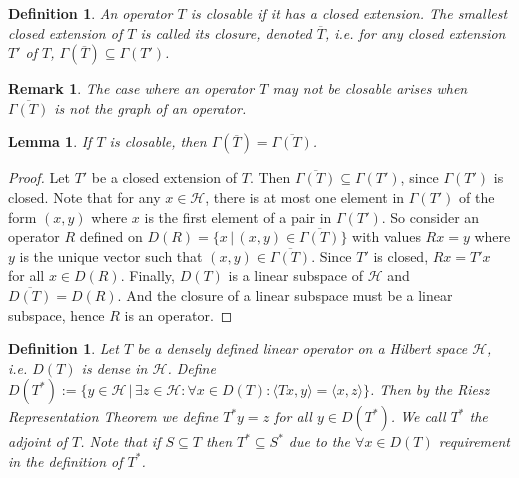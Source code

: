 \documentclass[12pt,oneside]{report}
\newtheorem{lem}[thm]{Lemma}
\newtheorem{defn}[thm]{Definition}
\newtheorem{rem}[thm]{Remark}
\begin{document}
\begin{defn}
    An operator $T$ is closable if it has a closed extension. The smallest closed extension of $T$ is called its closure, denoted $\overline{T}$, i.e. for any closed extension $T'$ of $T$, $\Gamma(\overline{T}) \subseteq \Gamma(T')$.
\end{defn}

\begin{rem}
    The case where an operator $T$ may not be closable arises when $\overline{\Gamma(T)}$ is not the graph of an operator.
\end{rem}

\begin{lem}
    If $T$ is closable, then $\Gamma(\overline{T}) = \overline{\Gamma(T)}$.
\end{lem}
\begin{proof}
    Let $T'$ be a closed extension of $T$. Then $\overline{\Gamma(T)} \subseteq \Gamma(T')$, since $\Gamma(T')$ is closed. Note that for any $x \in \mathscr{H}$, there is at most one element in $\Gamma(T')$ of the form $(x, y)$ where $x$ is the first element of a pair in $\Gamma(T')$. So consider an operator $R$ defined on $D(R) = \{ x \, | \, (x,y) \in \overline{\Gamma(T)} \}$ with values $Rx = y$ where $y$ is the unique vector such that $(x,y) \in \overline{\Gamma(T)}$. Since $T'$ is closed, $Rx = T'x$ for all $x \in D(R)$. Finally, $D(T)$ is a linear subspace of $\mathscr{H}$ and $\overline{D(T)} = D(R)$. And the closure of a linear subspace must be a linear subspace, hence $R$ is an operator.
\end{proof}


\begin{defn}
    Let $T$ be a densely defined linear operator on a Hilbert space $\mathscr{H}$, i.e. $D(T)$ is dense in $\mathscr{H}$. Define $D(T^{*}) := \{ y \in \mathscr{H} \, | \, \exists z \in \mathscr{H}: \forall x \in D(T): \langle Tx,y \rangle = \langle x, z \rangle \}$. Then by the Riesz Representation Theorem we define $T^{*}y = z$ for all $y \in D(T^{*})$. We call $T^{*}$ the adjoint of $T$. Note that if $S \subseteq T$ then $T^{*} \subseteq S^{*}$ due to the $\forall x \in D(T)$ requirement in the definition of $T^{*}$.
\end{defn}

\end{document}
